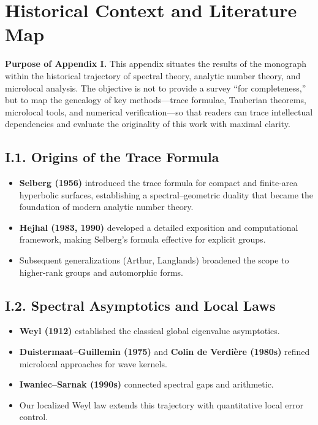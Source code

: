 
\section{Historical Context and Literature Map}\label{appI:root}

\noindent\textbf{Purpose of Appendix I.}  
This appendix situates the results of the monograph within the historical trajectory of spectral theory, analytic number theory, and microlocal analysis.  
The objective is not to provide a survey “for completeness,” but to map the genealogy of key methods—trace formulae, Tauberian theorems, microlocal tools, and numerical verification—so that readers can trace intellectual dependencies and evaluate the originality of this work with maximal clarity.  

\subsection*{I.1. Origins of the Trace Formula}  
\begin{itemize}
  \item \textbf{Selberg (1956)} introduced the trace formula for compact and finite-area hyperbolic surfaces, establishing a spectral–geometric duality that became the foundation of modern analytic number theory.  
  \item \textbf{Hejhal (1983, 1990)} developed a detailed exposition and computational framework, making Selberg’s formula effective for explicit groups.  
  \item Subsequent generalizations (Arthur, Langlands) broadened the scope to higher-rank groups and automorphic forms.  
\end{itemize}

\subsection*{I.2. Spectral Asymptotics and Local Laws}  
\begin{itemize}
  \item \textbf{Weyl (1912)} established the classical global eigenvalue asymptotics.  
  \item \textbf{Duistermaat–Guillemin (1975)} and \textbf{Colin de Verdière (1980s)} refined microlocal approaches for wave kernels.  
  \item \textbf{Iwaniec–Sarnak (1990s)} connected spectral gaps and arithmetic.  
  \item Our localized Weyl law extends this trajectory with quantitative local error control.  
\end{itemize}

